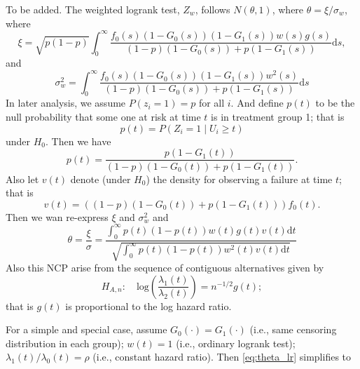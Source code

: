 \documentclass[a4paper,12pt]{article}
\begin{document}
{\color{red}To be added.}
The weighted logrank test, $Z_w$, follows $N\left(\theta, 1\right)$, where $\theta = \xi / \sigma_w$, where
\begin{equation}
  \label{eq:xi}
  \xi = \sqrt{p\left(1 - p\right)}
  \int_0^{\infty}
    \frac{
    f_0\left(s\right)\left(1 - G_0\left(s\right)\right)
    \left(1 - G_1\left(s\right)\right)
    w\left(s\right)g\left(s\right)
  }{
    \left(1 - p\right)
    \left(1 - G_0\left(s\right)\right)
    + p\left(1 - G_1\left(s\right)\right)
  }
  \mathrm{d}s
  ,
\end{equation}
and
\begin{equation}
  \label{eq:sigma}
  \sigma_w^2 =
  \int_0^\infty
  \frac{
    f_0\left(s\right)\left(1 - G_0\left(s\right)\right)\left(1 - G_1\left(s\right)\right)w^2\left(s\right)
  }{
    \left(1 - p\right)
    \left(1 - G_0\left(s\right)\right)
    + p\left(1 - G_1\left(s\right)\right)
  }
  \mathrm{d}s
\end{equation}
In later analysis, we assume  $P\left(z_i = 1\right) = p$ for all $i$. And define $p\left(t\right)$ to be the null probability that some one at risk at time $t$ is in treatment group 1; that is 
\[
  p\left(t\right) = P\left(Z_i = 1\middle|U_i\geq t\right)
\]
under $H_0$. Then we have
\[
  p\left(t\right) = \frac{
    p\left(1 - G_1\left(t\right)\right)
  }{
    \left(1 - p\right)\left(1 - G_0\left(t\right)\right)
    + p\left(1 - G_1\left(t\right)\right)
  }
  .
\]
Also let $v\left(t\right)$ denote (under $H_0$) the density for observing a failure at  time $t$; that is
\[
  v\left(t\right)
  = \left(
    \left(1 - p\right)\left(1 - G_0\left(t\right)\right)
    + p\left(1 - G_1\left(t\right)\right)
  \right)f_0\left(t\right)
  .
\]
Then we wan re-express $\xi$ and $\sigma_w^2$ and
\begin{equation}
  \label{eq:theta_lr}
  \theta = \frac{\xi}{\sigma}
  = \frac{
    \int_0^\infty
    p\left(t\right)\left(1 - p\left(t\right)\right)
    w\left(t\right)
    g\left(t\right)
    v\left(t\right)
    \mathrm{d}t
  }{
    \sqrt{\int_0^\infty
      p\left(t\right)\left(1 - p\left(t\right)\right)
      w^2\left(t\right)v\left(t\right)
      \mathrm{d}t
    }
  }
\end{equation}
Also this NCP arise from the sequence of contiguous alternatives given by
\[
  H_{A, n}: \quad
  \mathrm{log}\left(
    \frac{\lambda_1\left(t\right)}{\lambda_2\left(t\right)}
  \right)
  = n^{-1 / 2}g\left(t\right)
  ;
\]
that is $g\left(t\right)$ is proportional to the log hazard ratio.
\par
For a simple and special case, assume $G_0\left(\cdot\right) = G_1\left(\cdot\right)$ (i.e., same censoring distribution in each group); $w\left(t\right) = 1$ (i.e., ordinary logrank test); $\lambda_1\left(t\right) / \lambda_0\left(t\right) = \rho$ (i.e., constant hazard ratio). Then \eqref{eq:theta_lr} simplifies to
\end{document}

